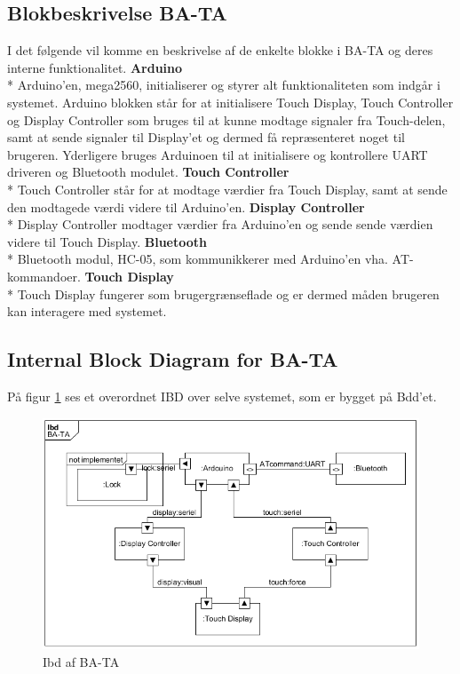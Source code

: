 \subsection{Blokbeskrivelse BA-TA}
I det følgende vil komme en beskrivelse af de enkelte blokke i BA-TA og deres interne funktionalitet.
\newline
\newline
\textbf{Arduino} \\*
Arduino'en, mega2560, initialiserer og styrer alt funktionaliteten som indgår i systemet. Arduino blokken står for at initialisere  Touch Display, Touch Controller og Display Controller som bruges til at kunne modtage signaler fra Touch-delen, samt at sende signaler til Display'et og dermed få repræsenteret noget til brugeren. Yderligere bruges Arduinoen til at initialisere og kontrollere UART driveren og Bluetooth modulet.
\newline
\newline
\textbf{Touch Controller} \\*
Touch Controller står for at modtage værdier fra Touch Display, samt at sende den modtagede værdi videre til Arduino'en. 
\newline
\newline
\textbf{Display Controller} \\*
Display Controller modtager værdier fra Arduino'en og sende sende værdien videre til Touch Display. \newline
\newline
\textbf{Bluetooth} \\*
Bluetooth modul, HC-05, som kommunikkerer med Arduino'en vha. AT-kommandoer.
\newline
\newline
\textbf{Touch Display} \\*
Touch Display fungerer som brugergrænseflade og er dermed måden brugeren kan interagere med systemet. 
\subsection{Internal Block Diagram for BA-TA}
På figur \ref{fig:Ibd} ses et overordnet IBD over selve systemet, som er bygget på Bdd'et. 
\begin{figure}[H]
	\centering
	\includegraphics[width = 300 pt]{Img/Ibd.png}
	\caption{Ibd af BA-TA}
	\label{fig:Ibd}
\end{figure}



